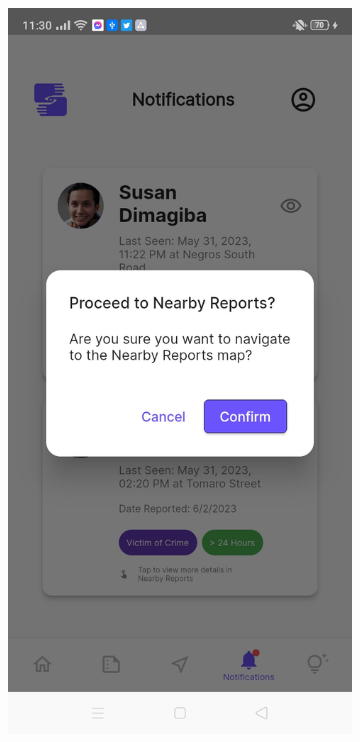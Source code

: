 \begin{figure}[!h]
\begin{subfigure}[c]{0.30\linewidth}
        \centering
        \includegraphics[scale=0.15]{figures/Chapter4/Main/Notifications-2.jpg}
    \end{subfigure}
    \centering
    \begin{subfigure}[c]{0.30\linewidth}

\end{subfigure}
\end{figure}
